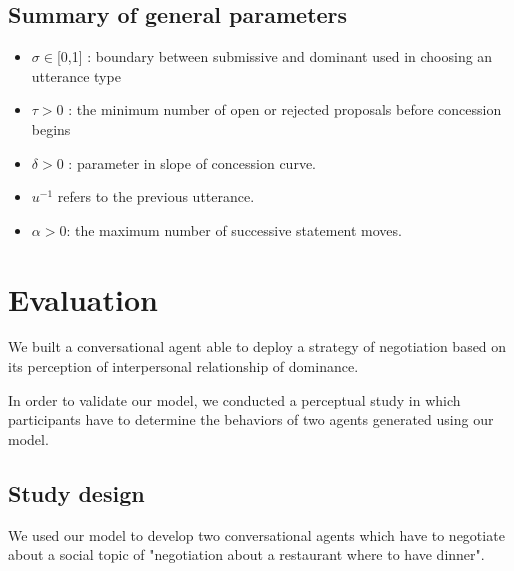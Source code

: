 \documentclass{llncs}
\begin{document}
			\subsection{Summary of general parameters }
				\begin{itemize}[noitemsep]
					
					\item $\sigma \in $[0,1] : boundary between submissive and dominant used in
					choosing an utterance type
					\item $\tau > 0$ : the minimum number of open or rejected proposals before concession begins
					\item $\delta > 0$ : parameter in slope of concession curve.
					\item $u^{-1}$ refers to the previous utterance.
					\item $\alpha> 0$: the maximum number of successive statement moves.
					
					
				\end{itemize}
				
			
						  
				\section{Evaluation}
				
				 We built a conversational agent able to deploy a strategy of negotiation based on its perception of interpersonal relationship of dominance. 
				 
				 In order to validate our model, we conducted a perceptual study in which participants have to determine the behaviors of two agents generated using our model. 
				 
					\subsection{Study design}
				We used our model to develop two conversational agents which have to negotiate about a social topic of "negotiation about a restaurant where to have dinner".
				
\end{document}
